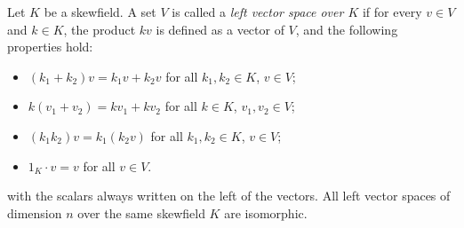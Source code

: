 Let $K$ be a skewfield. A set $V$ is called a \textit{left vector space over $K$} if for every $v \in V$ and $k \in K$, the product $kv$ is defined as a vector of $V$, and the following properties hold:
\begin{itemize}
\item $(k_1 + k_2)v = k_1 v + k_2 v$ for all $k_1, k_2 \in K$, $v \in V$;
\item $k(v_1 + v_2) = k v_1 + k v_2$ for all $k \in K$, $v_1, v_2 \in V$;
\item $(k_1 k_2)v = k_1(k_2 v)$ for all $k_1, k_2 \in K$, $v \in V$;
\item $1_K \cdot v = v$ for all $v \in V$.
\end{itemize}
with the scalars always written on the left of the vectors. All left vector spaces of dimension $n$ over the same skewfield $K$ are isomorphic.
